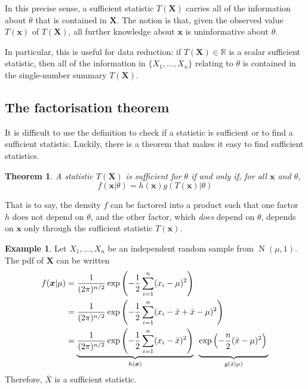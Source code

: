 \documentclass[
]{book}
\newcommand{\bx}{{\boldsymbol x}}
\newcommand{\bX}{{\boldsymbol X}}
\DeclareMathOperator{\N}{N}
\newcommand{\bbR}{\mathbb{R}}
\newcommand{\half}[1][1]{\frac{#1}{2}}  %
\newtheorem{theorem}{Theorem}[chapter]
\theoremstyle{definition}
\theoremstyle{definition}
\newtheorem{example}{Example}[chapter]
\theoremstyle{definition}
\theoremstyle{definition}
\theoremstyle{remark}
\begin{document}
In this precise sense, a sufficient statistic \(T(\bX)\) carries all of the information about \(\theta\) that is contained in \(\bX\).
The notion is that, given the observed value \(T(\bx)\) of \(T(\bX)\), all further knowledge about \(\bx\) is uninformative about \(\theta\).

In particular, this is useful for data reduction: if \(T(\bX) \in \bbR\) is a scalar sufficient statistic, then all of the information in \(\{X_1,\dots,X_n\}\) relating to \(\theta\) is contained in the single-number summary \(T(\bX)\).

\hypertarget{the-factorisation-theorem}{%
\subsection{The factorisation theorem}\label{the-factorisation-theorem}}

It is difficult to use the definition to check if a statistic is sufficient or to find a sufficient statistic. Luckily, there is a theorem that makes it easy to find sufficient statistics.

\begin{theorem}
A statistic \(T(\bX)\) is sufficient for \(\theta\) if and only if, for all \(\bx\) and \(\theta\),
\[
f(\bx|\theta) = h(\bx)g(T(\bx)|\theta)
\]
\end{theorem}

That is to say, the density \(f\) can be factored into a product such that one factor \(h\) does not depend on \(\theta\), and the other factor, which \emph{does} depend on \(\theta\), depends on \(\bx\) only through the sufficient statistic \(T(\bx)\).

\begin{example}
Let \(X_1,\dots,X_n\) be an independent random sample from \(\N(\mu,1)\). The pdf of \(\bX\) can be written
\begin{align*}
f(\bx|\mu) 
&= \frac{1}{(2\pi)^{n/2}}\exp\left(-\half \sum_{i=1}^n(x_i-\mu)^2 \right) \\
&= \frac{1}{(2\pi)^{n/2}}\exp\left(-\half \sum_{i=1}^n(x_i-\bar x + \bar x -\mu)^2 \right) \\
&= 
\underbrace{\frac{1}{(2\pi)^{n/2}}\exp\left(-\half \sum_{i=1}^n(x_i-\bar x)^2 \right)}_{h(\bx)} \hspace{0.5em} 
\underbrace{\exp\left(-\frac{n}{2}(\bar x - \mu)^2 \right) 
\vphantom{  \frac{1}{(2\pi)^{n/2}}\exp\left(-\half \sum_{i=1}^n(x_i-\bar x)^2 \right)  }}_{g(\bar x|\mu)}
\end{align*}
Therefore, \(\bar X\) is a sufficient statistic.
\end{example}
\end{document}
